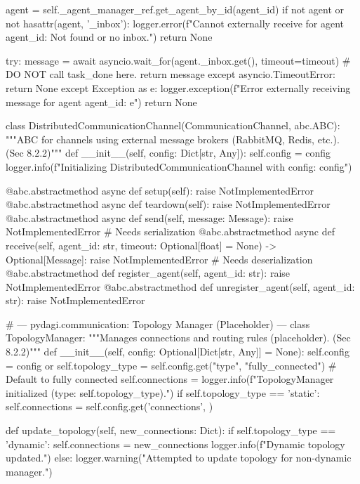 \documentclass{amsbook}
\theoremstyle{definition}
\theoremstyle{remark}
\numberwithin{equation}{chapter} %
\begin{document}
\begin{python}
        agent = self._agent_manager_ref.get_agent_by_id(agent_id)
        if not agent or not hasattr(agent, '_inbox'):
            logger.error(f"Cannot externally receive for agent {agent_id}: Not found or no inbox.")
            return None

        try:
            message = await asyncio.wait_for(agent._inbox.get(), timeout=timeout)
            # DO NOT call task_done here.
            return message
        except asyncio.TimeoutError:
            return None
        except Exception as e:
            logger.exception(f"Error externally receiving message for agent {agent_id}: {e}")
            return None


class DistributedCommunicationChannel(CommunicationChannel, abc.ABC):
    """ABC for channels using external message brokers (RabbitMQ, Redis, etc.). (Sec 8.2.2)"""
    def __init__(self, config: Dict[str, Any]):
        self.config = config
        logger.info(f"Initializing DistributedCommunicationChannel with config: {config}")

    @abc.abstractmethod
    async def setup(self): raise NotImplementedError
    @abc.abstractmethod
    async def teardown(self): raise NotImplementedError
    @abc.abstractmethod
    async def send(self, message: Message): raise NotImplementedError # Needs serialization
    @abc.abstractmethod
    async def receive(self, agent_id: str, timeout: Optional[float] = None) -> Optional[Message]: raise NotImplementedError # Needs deserialization
    @abc.abstractmethod
    def register_agent(self, agent_id: str): raise NotImplementedError
    @abc.abstractmethod
    def unregister_agent(self, agent_id: str): raise NotImplementedError


# --- pydagi.communication: Topology Manager (Placeholder) ---
class TopologyManager:
    """Manages connections and routing rules (placeholder). (Sec 8.2.2)"""
    def __init__(self, config: Optional[Dict[str, Any]] = None):
        self.config = config or {}
        self.topology_type = self.config.get("type", "fully_connected") # Default to fully connected
        self.connections = {}
        logger.info(f"TopologyManager initialized (type: {self.topology_type}).")
        if self.topology_type == 'static':
             self.connections = self.config.get('connections', {})

    def update_topology(self, new_connections: Dict):
        if self.topology_type == 'dynamic':
             self.connections = new_connections
             logger.info(f"Dynamic topology updated.")
        else:
             logger.warning("Attempted to update topology for non-dynamic manager.")


\end{python}
\end{document}
